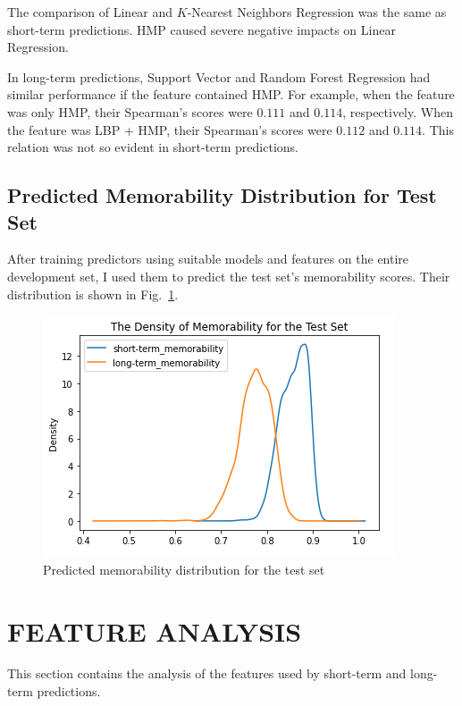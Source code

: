 \documentclass[conference, compsoc]{IEEEtran}
\begin{document}
{The comparison of Linear and $K$-Nearest Neighbors Regression was the same as short-term predictions.
HMP caused severe negative impacts on Linear Regression.

In long-term predictions, Support Vector and Random Forest Regression had similar performance if the feature contained HMP.
For example, when the feature was only HMP, their Spearman's scores were $0.111$ and $0.114$, respectively.
When the feature was LBP + HMP, their Spearman's scores were $0.112$ and $0.114$.
This relation was not so evident in short-term predictions.

\subsection{Predicted Memorability Distribution for Test Set}
After training predictors using suitable models and features on the entire development set, I used them to predict the test set's memorability scores.
Their distribution is shown in Fig.~\ref{fig:test-set-memo-distribution}.

\begin{figure}[htbp]
    \centerline{\includegraphics[width=\linewidth]{figures/test-set-memo-distribution.png}}
    \caption{Predicted memorability distribution for the test set}
    \label{fig:test-set-memo-distribution}
\end{figure}


\section{FEATURE ANALYSIS}
This section contains the analysis of the features used by short-term and long-term predictions.

}
\end{document}
